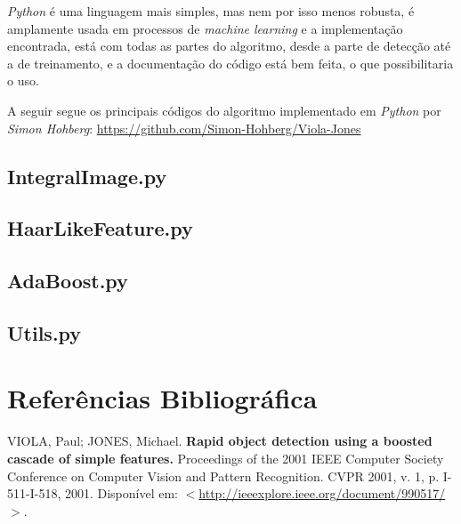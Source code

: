 \documentclass[12pt,a4paper]{article}
\begin{document}
\textit{Python} é uma linguagem mais simples, mas nem por isso menos robusta, é amplamente usada em processos de \textit{machine learning} e a implementação encontrada, está com todas as partes do algoritmo, desde a parte de detecção até a de treinamento, e a documentação do código está bem feita, o que possibilitaria o uso.

A seguir segue os principais códigos do algoritmo implementado em \textit{Python} por \textit{Simon Hohberg}:
\url{https://github.com/Simon-Hohberg/Viola-Jones}



\subsection{IntegralImage.py}


 
 
 \subsection{HaarLikeFeature.py}

 

\subsection{AdaBoost.py}


\subsection{Utils.py}






%


\newpage
\section{Referências Bibliográfica}
\noindent VIOLA, Paul; JONES, Michael. \textbf{Rapid object detection using a boosted cascade of simple features.} Proceedings of the 2001 IEEE Computer Society Conference on Computer Vision and Pattern Recognition. CVPR 2001, v. 1, p. I-511-I-518, 2001. Disponível em: $<$\url{http://ieeexplore.ieee.org/document/990517/}$>$.\\\vspace{0.2cm}
\end{document}
